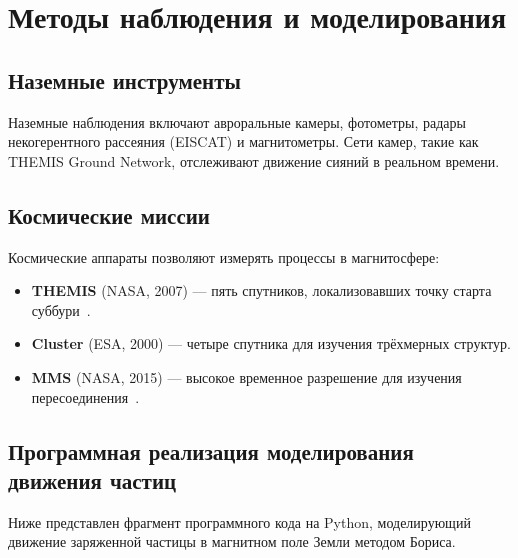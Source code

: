 \section{Методы наблюдения и моделирования}

\subsection{Наземные инструменты}

Наземные наблюдения включают авроральные камеры, фотометры, радары некогерентного рассеяния (EISCAT) и магнитометры. Сети камер, такие как THEMIS Ground Network, отслеживают движение сияний в реальном времени.

\subsection{Космические миссии}

Космические аппараты позволяют измерять процессы в магнитосфере:
\begin{itemize}
    \item \textbf{THEMIS} (NASA, 2007) --- пять спутников, локализовавших точку старта суббури~\cite{angelopoulos2008}.
    \item \textbf{Cluster} (ESA, 2000) --- четыре спутника для изучения трёхмерных структур.
    \item \textbf{MMS} (NASA, 2015) --- высокое временное разрешение для изучения пересоединения~\cite{burch2016}.
\end{itemize}

\subsection{Программная реализация моделирования движения частиц}

Ниже представлен фрагмент программного кода на Python, моделирующий движение заряженной частицы в магнитном поле Земли методом Бориса.

